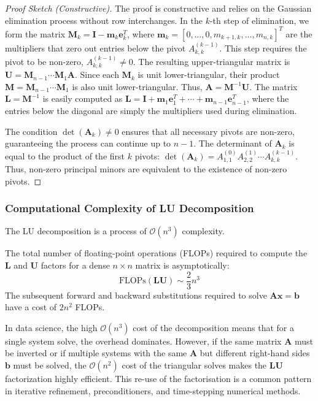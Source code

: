 \begin{proof}[Proof Sketch (Constructive)]
The proof is constructive and relies on the Gaussian elimination process without row interchanges. In the $k$-th step of elimination, we form the matrix $\mathbf{M}_k = \mathbf{I} - \mathbf{m}_k \mathbf{e}_k^T$, where $\mathbf{m}_k = [0, \dots, 0, m_{k+1, k}, \dots, m_{n, k}]^T$ are the multipliers that zero out entries below the pivot $A_{k, k}^{(k-1)}$. This step requires the pivot to be non-zero, $A_{k, k}^{(k-1)} \ne 0$. The resulting upper-triangular matrix is $\mathbf{U} = \mathbf{M}_{n-1} \cdots \mathbf{M}_1 \mathbf{A}$. Since each $\mathbf{M}_k$ is unit lower-triangular, their product $\mathbf{M} = \mathbf{M}_{n-1} \cdots \mathbf{M}_1$ is also unit lower-triangular. Thus, $\mathbf{A} = \mathbf{M}^{-1}\mathbf{U}$. The matrix $\mathbf{L} = \mathbf{M}^{-1}$ is easily computed as $\mathbf{L} = \mathbf{I} + \mathbf{m}_1 \mathbf{e}_1^T + \cdots + \mathbf{m}_{n-1} \mathbf{e}_{n-1}^T$, where the entries below the diagonal are simply the multipliers used during elimination.

The condition $\det(\mathbf{A}_k) \ne 0$ ensures that all necessary pivots are non-zero, guaranteeing the process can continue up to $n-1$. The determinant of $\mathbf{A}_k$ is equal to the product of the first $k$ pivots: $\det(\mathbf{A}_k) = A_{1, 1}^{(0)} A_{2, 2}^{(1)} \cdots A_{k, k}^{(k-1)}$. Thus, non-zero principal minors are equivalent to the existence of non-zero pivots.
\end{proof}

\subsubsection{Computational Complexity of LU Decomposition}

The LU decomposition is a process of $\mathcal{O}(n^3)$ complexity.

\begin{proposition}
The total number of floating-point operations (FLOPs) required to compute the $\mathbf{L}$ and $\mathbf{U}$ factors for a dense $n \times n$ matrix is asymptotically:
\[ \text{FLOPs}(\mathbf{LU}) \sim \frac{2}{3} n^3 \]
The subsequent forward and backward substitutions required to solve $\mathbf{A}\mathbf{x}=\mathbf{b}$ have a cost of $2n^2$ FLOPs.
\end{proposition}
\begin{remark}
In data science, the high $\mathcal{O}(n^3)$ cost of the decomposition means that for a single system solve, the overhead dominates. However, if the same matrix $\mathbf{A}$ must be inverted or if multiple systems with the same $\mathbf{A}$ but different right-hand sides $\mathbf{b}$ must be solved, the $\mathcal{O}(n^2)$ cost of the triangular solves makes the $\mathbf{LU}$ factorization highly efficient. This re-use of the factorisation is a common pattern in iterative refinement, preconditioners, and time-stepping numerical methods.
\end{remark}

